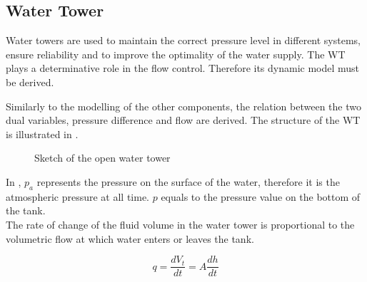 \subsection{Water Tower} 
\label{WaterTankModel}

Water towers are used to maintain the correct pressure level in different systems, ensure reliability and to improve the optimality of the water supply. The WT plays a determinative role in the flow control. Therefore its dynamic model must be derived. 

Similarly to the modelling of the other components, the relation between the two dual variables, pressure difference and flow are  derived. The structure of the WT is illustrated in .


\begin{figure}[H]
\centering
 
\caption{Sketch of the open water tower}
\label{fig:watertower_sketch}
\end{figure}

In , $p_a$ represents the pressure on the surface of the water, therefore it is the atmospheric pressure at all time. $p$ equals to the pressure value on the bottom of the tank. \\
The rate of change of the fluid volume in the water tower is proportional to the volumetric flow at which water enters or leaves the tank. 

\begin{equation}
  q = \frac{dV_t}{dt} = A \frac{dh}{dt}
  \label{Flowequation}
\end{equation}

